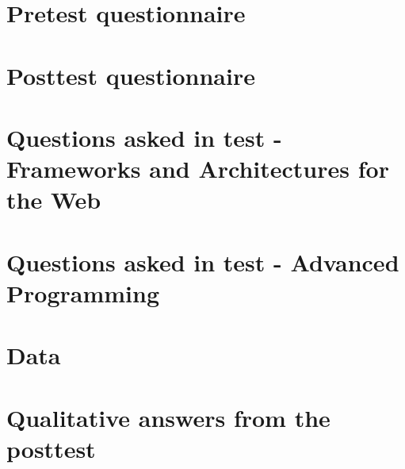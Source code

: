 \begin{appendices}

\section{Pretest questionnaire}\label{app:pretest}
 \clearpage


\section{Posttest questionnaire}\label{app:posttest}
 \clearpage


\section{Questions asked in test - Frameworks and Architectures for the Web}\label{app:questions}
 \clearpage

\section{Questions asked in test - Advanced Programming}\label{app:questions-advanced}
 \clearpage



\section{Data} \label{app:data}

\clearpage

\section{Qualitative answers from the posttest}\label{app:qualitative-answers-posttest}
 \clearpage


\end{appendices}